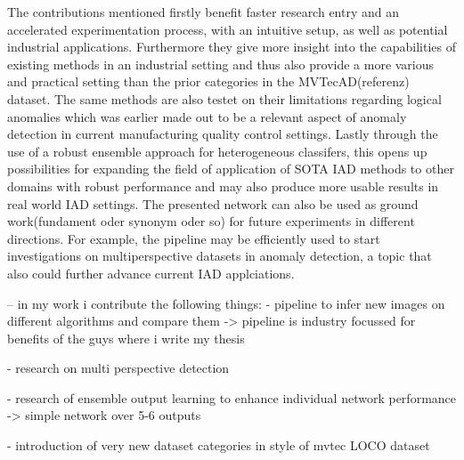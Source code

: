 The contributions mentioned firstly benefit faster research entry and an accelerated experimentation process, with an intuitive setup, 
as well as potential industrial applications. 
Furthermore they give more insight into the capabilities of existing methods in an industrial setting and thus also provide a more 
various and practical setting than the prior categories in the MVTecAD(referenz) dataset. The same methods are also testet on their limitations 
regarding logical anomalies which was earlier made out to be a relevant aspect of anomaly detection in current manufacturing quality control 
settings. Lastly through the use of a robust ensemble approach for heterogeneous classifers, this opens up possibilities for expanding 
the field of application of SOTA IAD methods to other domains with robust performance and may also produce more usable results in real 
world IAD settings. The presented network can also be used as ground work(fundament oder synonym oder so) for future experiments in 
different directions. For example, the pipeline may be efficiently used to start investigations on multiperspective datasets in anomaly 
detection, a topic that also could further advance current IAD applciations.




-- in my work i contribute the following things:
- pipeline to infer new images on different algorithms and compare them
-> pipeline is industry focussed for benefits of the guys where i write my thesis

- research on multi perspective detection

- research of ensemble output learning to enhance individual network performance
-> simple network over 5-6 outputs

- introduction of very new dataset categories in style of mvtec LOCO dataset

